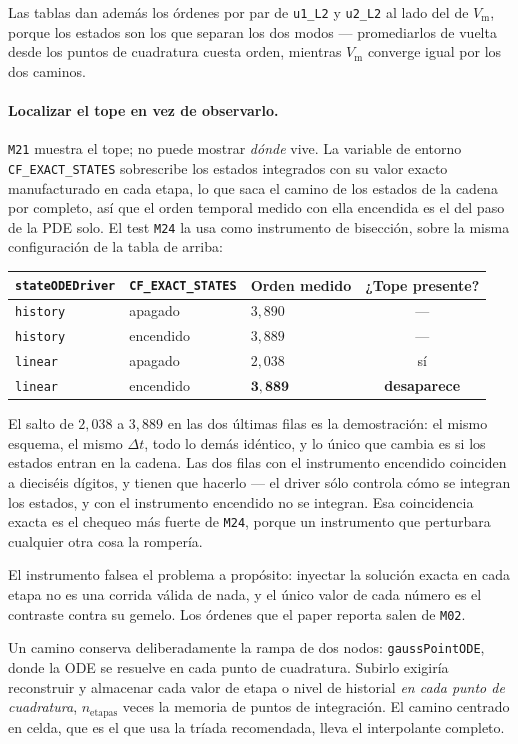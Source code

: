\documentclass[11pt,a4paper]{article}
\newcommand{\code}[1]{\texttt{\small #1}}
\newcommand{\Vm}{V_{\text{m}}}
\begin{document}
Las tablas dan además los órdenes por par de \code{u1\_L2} y \code{u2\_L2} al lado
del de $\Vm$, porque los estados son los que separan los dos modos --- promediarlos
de vuelta desde los puntos de cuadratura cuesta orden, mientras $\Vm$ converge igual
por los dos caminos.

\paragraph{Localizar el tope en vez de observarlo.}
\code{M21} muestra el tope; no puede mostrar \emph{dónde} vive. La variable de entorno
\code{CF\_EXACT\_STATES} sobrescribe los estados integrados con su valor exacto manufacturado en
cada etapa, lo que saca el camino de los estados de la cadena por completo, así que el orden
temporal medido con ella encendida es el del paso de la PDE solo. El test \code{M24} la usa como
instrumento de bisección, sobre la misma configuración de la tabla de arriba:
\begin{center}
\begin{tabular}{@{}lllc@{}}
\toprule
\code{stateODEDriver} & \code{CF\_EXACT\_STATES} & Orden medido & ¿Tope presente? \\
\midrule
\code{history} & apagado  & $3{,}890$ & --- \\
\code{history} & encendido & $3{,}889$ & --- \\
\code{linear}  & apagado  & $2{,}038$ & sí \\
\code{linear}  & encendido & $\mathbf{3{,}889}$ & \textbf{desaparece} \\
\bottomrule
\end{tabular}
\end{center}
El salto de $2{,}038$ a $3{,}889$ en las dos últimas filas es la demostración: el mismo esquema,
el mismo $\Delta t$, todo lo demás idéntico, y lo único que cambia es si los estados entran en
la cadena. Las dos filas con el instrumento encendido coinciden a dieciséis dígitos, y tienen que
hacerlo --- el driver sólo controla cómo se integran los estados, y con el instrumento encendido
no se integran. Esa coincidencia exacta es el chequeo más fuerte de \code{M24}, porque un
instrumento que perturbara cualquier otra cosa la rompería.

El instrumento falsea el problema a propósito: inyectar la solución exacta en cada etapa no es
una corrida válida de nada, y el único valor de cada número es el contraste contra su gemelo.
Los órdenes que el paper reporta salen de \code{M02}.

Un camino conserva deliberadamente la rampa de dos nodos: \code{gaussPointODE}, donde la ODE
se resuelve en cada punto de cuadratura. Subirlo exigiría reconstruir y almacenar cada valor
de etapa o nivel de historial \emph{en cada punto de cuadratura}, $n_{\text{etapas}}$ veces
la memoria de puntos de integración. El camino centrado en celda, que es el que usa la
tríada recomendada, lleva el interpolante completo.
\end{document}
